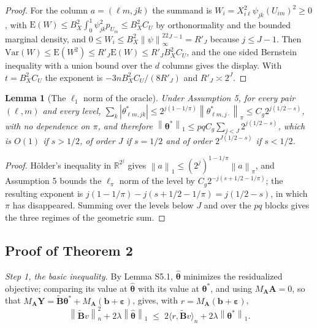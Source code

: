 \documentclass[10pt]{book}
\newtheorem{lemma}{Lemma}[section]
\theoremstyle{definition}
\newcommand{\R}{\mathbb{R}}
\newcommand{\E}{\mathrm{E}}
\newcommand{\Var}{\mathrm{Var}}
\newcommand{\norm}[1]{\left\lVert #1 \right\rVert}
\newcommand{\normn}[1]{\left\lVert #1 \right\rVert_{n}}
\newcommand{\inner}[2]{\langle #1, #2 \rangle}
\newcommand{\cv}{\ell}
\newcommand{\md}{m}
\newcommand{\lev}{j}
\newcommand{\tsl}{k}
\newcommand{\wav}[2]{\psi_{#1#2}}
\newcommand{\coefs}[4]{\theta^{*}_{#1#2,#3#4}}
\newcommand{\btheta}{\boldsymbol{\theta}}
\newcommand{\thetastar}{\btheta^{*}}
\newcommand{\thetahat}{\widehat{\btheta}}
\newcommand{\pen}{\lambda}
\newcommand{\Amat}{\mathbf{A}}
\newcommand{\Bmat}{\mathbf{B}}
\newcommand{\Btil}{\widetilde{\Bmat}}
\newcommand{\MA}{M_{\Amat}}
\newcommand{\bveps}{\boldsymbol{\varepsilon}}
\newcommand{\bb}{\mathbf{b}}
\newcommand{\bY}{\mathbf{Y}}
\begin{document}
\begin{proof}
For the column $a = (\cv\md,\lev\tsl)$ the summand is
$W_i = X_{i\cv}^2\wav{\lev}{\tsl}(U_{i\md})^2 \ge 0$, with
$\E(W) \le B_X^2\int_0^1\wav{\lev}{\tsl}^2p_{U_{\md}} \le B_X^2C_U$ by
orthonormality and the bounded marginal density, and
$0 \le W_i \le B_X^2\norm{\psi}_{\infty}^22^{J-1} = R'_J$ because
$\lev \le J-1$. Then $\Var(W) \le \E(W^2) \le R'_J\E(W) \le R'_JB_X^2C_U$, and
the one sided Bernstein inequality with a union bound over the $d$ columns
gives the display. With $t = B_X^2C_U$ the exponent is
$-3nB_X^2C_U/(8R'_J)$ and $R'_J \asymp 2^J$.
\end{proof}

\begin{lemma}[The $\ell_1$ norm of the \textcolor{colR1}{oracle}]
\label{lem:l1}
Under Assumption 5, for every pair $(\cv,\md)$ and every level,
$\sum_{\tsl}|\coefs{\cv}{\md}{\lev}{\tsl}| \le
2^{\lev(1-1/\pi)}\norm{\theta^{*}_{\cv\md,\lev\cdot}}_{\pi} \le
C_g2^{\lev(1/2-s)}$, with no dependence on $\pi$, and therefore
$\norm{\thetastar}_1 \le pqC_g\sum_{\lev<J}2^{\lev(1/2-s)}$, which is
$O(1)$ if $s>1/2$, of order $J$ if $s = 1/2$ and of order
$2^{J(1/2-s)}$ if $s<1/2$.
\end{lemma}

\begin{proof}
Hölder's inequality in $\R^{2^{\lev}}$ gives
$\norm{a}_1 \le (2^{\lev})^{1-1/\pi}\norm{a}_{\pi}$, and Assumption 5 bounds
the $\ell_\pi$ norm of the level by $C_g2^{-\lev(s+1/2-1/\pi)}$; the resulting
exponent is $\lev(1-1/\pi)-\lev(s+1/2-1/\pi) = \lev(1/2-s)$, in which $\pi$
has disappeared. Summing over the levels below $J$ and over the $pq$ blocks
gives the three regimes of the geometric sum.
\end{proof}

\subsection*{Proof of Theorem 2}

\emph{Step 1, the basic inequality.} By Lemma S5.1, $\thetahat$ minimizes the
residualized objective; comparing its value at $\thetahat$ with its value at
$\thetastar$, and using $\MA\Amat = 0$, so that
$\MA\bY = \Btil\thetastar + \MA(\bb+\bveps)$, gives, with
$r = \MA(\bb+\bveps)$,
\begin{equation}
  \label{eq:basic}
  \normn{\Btil v}^2 + 2\pen\norm{\thetahat}_1
  \;\le\; 2\inner{r}{\Btil v}_n + 2\pen\norm{\thetastar}_1 .
\end{equation}
\end{document}
